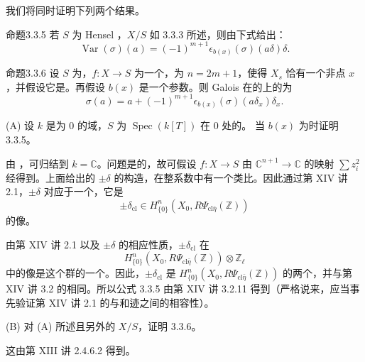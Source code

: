 我们将同时证明下列两个结果。
\begin{SGAresult}{命题}{3.3.5}
若 $S$ 为 Hensel ，$X/S$ 如 3.3.3 所述，则由下式给出：
\[
 \operatorname{Var}(\sigma)(a)=(-1)^{m+1}\epsilon_{b(x)}(\sigma)(a\delta)\delta.
\]
\end{SGAresult}
\begin{SGAresult}{命题}{3.3.6}
设 $S$ 为，$f:X\to S$ 为一个，为 $n=2m+1$，使得 $X_s$ 恰有一个非点 $x$，并假设它是。再假设 $b(x)$ 是一个参数。则 Galois 在的上的为
\[
 \sigma(a)=a+(-1)^{m+1}\epsilon_{b(x)}(\sigma)(a\delta_x)\delta_x.
\]
\end{SGAresult}
(A) 设 $k$ 是为 $0$ 的域，$S$ 为 $\operatorname{Spec}(k[T])$ 在 $0$ 处的。
当 $b(x)$ 为时证明 3.3.5。

由 ，可归结到 $k=\mathbb C$。问题是的，故可假设 $f:X\to S$ 由 $\mathbb C^{n+1}\to\mathbb C$ 的映射 $\sum z_i^2$ 经得到。上面给出的 $\pm\delta$ 的构造，在整系数中有一个类比。因此通过第 XIV 讲 2.1，$\pm\delta$ 对应于一个，它是
\[
 \pm\delta_{\mathrm{cl}}\in H^n_{\{0\}}(X_0,R\Psi_{\mathrm{cl}\bar\eta}(\mathbb Z))
\]
的像。

由第 XIV 讲 2.1 以及 $\pm\delta$ 的相应性质，$\pm\delta_{\mathrm{cl}}$ 在
\[
 H^n_{\{0\}}(X_0,R\Psi_{\mathrm{cl}\bar\eta}(\mathbb Z))\otimes\mathbb Z_\ell
\]
中的像是这个群的一个。因此，$\pm\delta_{\mathrm{cl}}$ 是 $H^n_{\{0\}}(X_0,R\Psi_{\mathrm{cl}\bar\eta}(\mathbb Z))$ 的两个，并与第 XIV 讲 3.2 的相同。所以公式 3.3.5 由第 XIV 讲 3.2.11 得到（严格说来，应当事先验证第 XIV 讲 2.1 的与和迹之间的相容性）。

(B) 对 (A) 所述且另外的 $X/S$，证明 3.3.6。

这由第 XIII 讲 2.4.6.2 得到。

